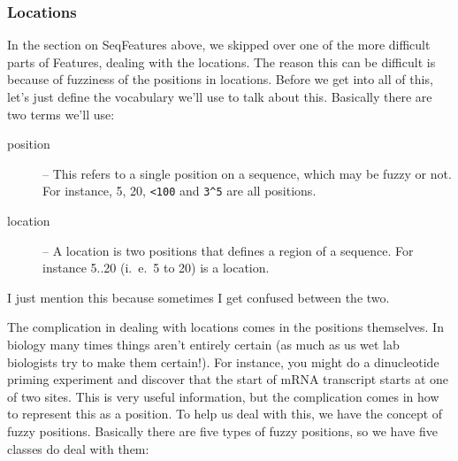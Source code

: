 \documentclass{report}
\begin{document}
\subsubsection{Locations}
\label{sec:locations}

In the section on SeqFeatures above, we skipped over one of the more difficult parts of Features, dealing with the locations. The reason this can be difficult is because of fuzziness of the positions in locations. Before we get into all of this, let's just define the vocabulary we'll use to talk about this. Basically there are two terms we'll use:

\begin{description}
  \item[position] -- This refers to a single position on a sequence,
  which may be fuzzy or not. For instance, 5, 20, \verb|<100| and
  \verb|3^5| are all positions.

  \item[location] -- A location is two positions that defines a region of a sequence. For instance 5..20 (i.~e.~5 to 20) is a location.
\end{description}

I just mention this because sometimes I get confused between the two.

The complication in dealing with locations comes in the positions themselves. In biology many times things aren't entirely certain (as much as us wet lab biologists try to make them certain!). For instance, you might do a dinucleotide priming experiment and discover that the start of mRNA transcript starts at one of two sites. This is very useful information, but the complication comes in how to represent this as a position. To help us deal with this, we have the concept of fuzzy positions. Basically there are five types of fuzzy positions, so we have five classes do deal with them:
\end{document}
